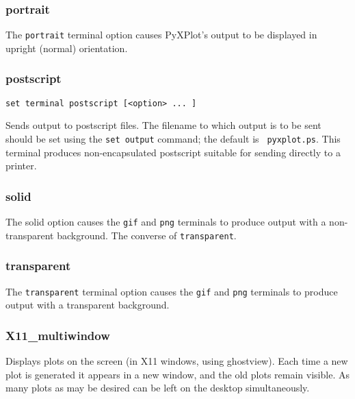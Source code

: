 \documentclass[a4paper,onecolumn,11pt]{book}
\begin{document}
\subsubsection{portrait}

The {\tt portrait} terminal option causes PyXPlot's output to be displayed in
upright (normal) orientation.
 

\subsubsection{postscript}

\begin{verbatim}
set terminal postscript [<option> ... ]
\end{verbatim}

Sends output to postscript files. The filename to which output is to be sent
should be set using the {\tt set output} command; the default is {\tt
pyxplot.ps}.  This terminal produces non-encapsulated postscript suitable for
sending directly to a printer.

\subsubsection{solid}

The solid option causes the {\tt gif} and {\tt png} terminals to produce output
with a non-transparent background. The converse of {\tt transparent}.


\subsubsection{transparent}

The {\tt transparent} terminal option causes the {\tt gif} and {\tt png}
terminals to produce output with a transparent background.


\subsubsection{X11\_multiwindow}

Displays plots on the screen (in X11 windows, using ghostview). Each time a new
plot is generated it appears in a new window, and the old plots remain visible.
As many plots as may be desired can be left on the desktop simultaneously.
\end{document}
